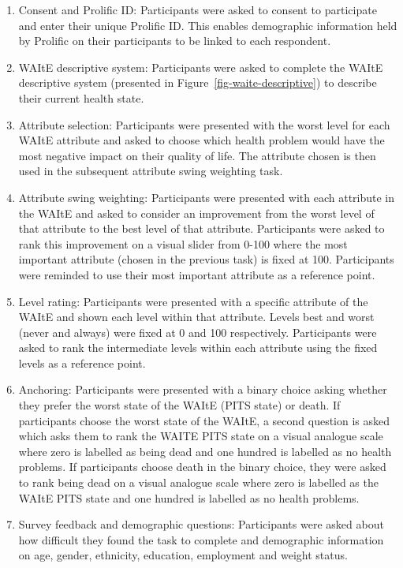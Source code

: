 \documentclass[
  letterpaper,
  DIV=11,
  numbers=noendperiod]{scrartcl}
\providecommand{\tightlist}{%
  \setlength{\itemsep}{0pt}\setlength{\parskip}{0pt}}\usepackage{longtable,booktabs,array}
\begin{document}
\begin{enumerate}
\def\labelenumi{\arabic{enumi}.}
\tightlist
\item
  Consent and Prolific ID: Participants were asked to consent to
  participate and enter their unique Prolific ID. This enables
  demographic information held by Prolific on their participants to be
  linked to each respondent.
\item
  WAItE descriptive system: Participants were asked to complete the
  WAItE descriptive system (presented in
  Figure~\ref{fig-waite-descriptive}) to describe their current health
  state.
\item
  Attribute selection: Participants were presented with the worst level
  for each WAItE attribute and asked to choose which health problem
  would have the most negative impact on their quality of life. The
  attribute chosen is then used in the subsequent attribute swing
  weighting task.
\item
  Attribute swing weighting: Participants were presented with each
  attribute in the WAItE and asked to consider an improvement from the
  worst level of that attribute to the best level of that attribute.
  Participants were asked to rank this improvement on a visual slider
  from 0-100 where the most important attribute (chosen in the previous
  task) is fixed at 100. Participants were reminded to use their most
  important attribute as a reference point.
\item
  Level rating: Participants were presented with a specific attribute of
  the WAItE and shown each level within that attribute. Levels best and
  worst (never and always) were fixed at 0 and 100 respectively.
  Participants were asked to rank the intermediate levels within each
  attribute using the fixed levels as a reference point.
\item
  Anchoring: Participants were presented with a binary choice asking
  whether they prefer the worst state of the WAItE (PITS state) or
  death. If participants choose the worst state of the WAItE, a second
  question is asked which asks them to rank the WAITE PITS state on a
  visual analogue scale where zero is labelled as being dead and one
  hundred is labelled as no health problems. If participants choose
  death in the binary choice, they were asked to rank being dead on a
  visual analogue scale where zero is labelled as the WAItE PITS state
  and one hundred is labelled as no health problems.
\item
  Survey feedback and demographic questions: Participants were asked
  about how difficult they found the task to complete and demographic
  information on age, gender, ethnicity, education, employment and
  weight status.
\end{enumerate}
\end{document}
